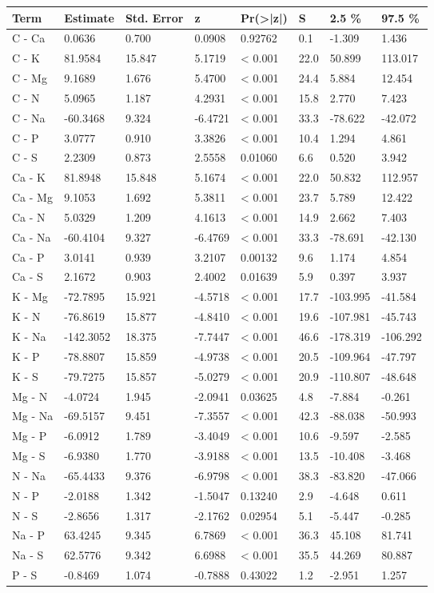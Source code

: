 
\begin{tabular}[t]{llllllll}
\toprule
Term & Estimate & Std. Error & z & Pr(>|z|) & S & 2.5 \% & 97.5 \%\\
\midrule
C - Ca & 0.0636 & 0.700 & 0.0908 & 0.92762 & 0.1 & -1.309 & 1.436\\
C - K & 81.9584 & 15.847 & 5.1719 & < 0.001 & 22.0 & 50.899 & 113.017\\
C - Mg & 9.1689 & 1.676 & 5.4700 & < 0.001 & 24.4 & 5.884 & 12.454\\
C - N & 5.0965 & 1.187 & 4.2931 & < 0.001 & 15.8 & 2.770 & 7.423\\
C - Na & -60.3468 & 9.324 & -6.4721 & < 0.001 & 33.3 & -78.622 & -42.072\\
C - P & 3.0777 & 0.910 & 3.3826 & < 0.001 & 10.4 & 1.294 & 4.861\\
C - S & 2.2309 & 0.873 & 2.5558 & 0.01060 & 6.6 & 0.520 & 3.942\\
Ca - K & 81.8948 & 15.848 & 5.1674 & < 0.001 & 22.0 & 50.832 & 112.957\\
Ca - Mg & 9.1053 & 1.692 & 5.3811 & < 0.001 & 23.7 & 5.789 & 12.422\\
Ca - N & 5.0329 & 1.209 & 4.1613 & < 0.001 & 14.9 & 2.662 & 7.403\\
Ca - Na & -60.4104 & 9.327 & -6.4769 & < 0.001 & 33.3 & -78.691 & -42.130\\
Ca - P & 3.0141 & 0.939 & 3.2107 & 0.00132 & 9.6 & 1.174 & 4.854\\
Ca - S & 2.1672 & 0.903 & 2.4002 & 0.01639 & 5.9 & 0.397 & 3.937\\
K - Mg & -72.7895 & 15.921 & -4.5718 & < 0.001 & 17.7 & -103.995 & -41.584\\
K - N & -76.8619 & 15.877 & -4.8410 & < 0.001 & 19.6 & -107.981 & -45.743\\
K - Na & -142.3052 & 18.375 & -7.7447 & < 0.001 & 46.6 & -178.319 & -106.292\\
K - P & -78.8807 & 15.859 & -4.9738 & < 0.001 & 20.5 & -109.964 & -47.797\\
K - S & -79.7275 & 15.857 & -5.0279 & < 0.001 & 20.9 & -110.807 & -48.648\\
Mg - N & -4.0724 & 1.945 & -2.0941 & 0.03625 & 4.8 & -7.884 & -0.261\\
Mg - Na & -69.5157 & 9.451 & -7.3557 & < 0.001 & 42.3 & -88.038 & -50.993\\
Mg - P & -6.0912 & 1.789 & -3.4049 & < 0.001 & 10.6 & -9.597 & -2.585\\
Mg - S & -6.9380 & 1.770 & -3.9188 & < 0.001 & 13.5 & -10.408 & -3.468\\
N - Na & -65.4433 & 9.376 & -6.9798 & < 0.001 & 38.3 & -83.820 & -47.066\\
N - P & -2.0188 & 1.342 & -1.5047 & 0.13240 & 2.9 & -4.648 & 0.611\\
N - S & -2.8656 & 1.317 & -2.1762 & 0.02954 & 5.1 & -5.447 & -0.285\\
Na - P & 63.4245 & 9.345 & 6.7869 & < 0.001 & 36.3 & 45.108 & 81.741\\
Na - S & 62.5776 & 9.342 & 6.6988 & < 0.001 & 35.5 & 44.269 & 80.887\\
P - S & -0.8469 & 1.074 & -0.7888 & 0.43022 & 1.2 & -2.951 & 1.257\\
\bottomrule
\end{tabular}

